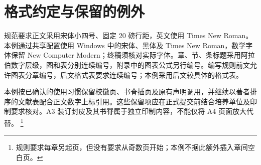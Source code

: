 \section{格式约定与保留的例外}

规范要求正文采用宋体小四号、固定 20 磅行距，英文使用 Times New Roman。本例通过共享配置使用 Windows 中的宋体、黑体及 Times New Roman，数学字体保留 New Computer Modern；终稿须核对实际字体。章、节、条标题采用阿拉伯数字层级，图和表分别连续编号，附录中的图表公式另行编号。编写规则前文允许图表分章编号，后文格式表要求连续编号；本例采用后文较具体的格式表。

本例按已确认的使用习惯保留校徽页、书脊插页及原有声明调用，并继续以著者排序的文献表配合正文数字上标引用。这些保留项应在正式提交前结合培养单位及印制要求核对。A3 装订封皮及其书脊属于独立印制内容，不能仅将 A4 页面放大代替。
\footnote{规则要求每章另起页，但没有要求从奇数页开始；本例不据此额外插入章间空白页。}
